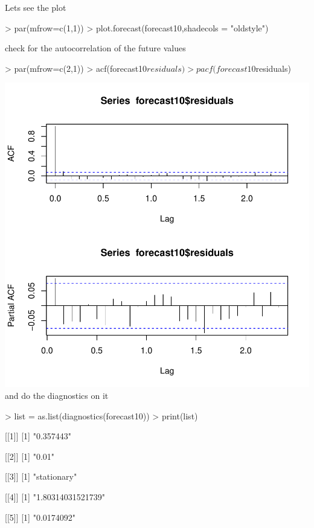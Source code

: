\documentclass[11pt, a4paper]{article} %
\begin{document}
Lets see the plot\\
\begin{Schunk}
\begin{Sinput}
> par(mfrow=c(1,1))
> plot.forecast(forecast10,shadecols = "oldstyle")
\end{Sinput}
\end{Schunk}
check for the autocorrelation of the future values\\
\begin{Schunk}
\begin{Sinput}
> par(mfrow=c(2,1))
> acf(forecast10$residuals)
> pacf(forecast10$residuals)
\end{Sinput}
\end{Schunk}
\includegraphics{alleselena-058}
and do the diagnostics on it\\
\begin{Schunk}
\begin{Sinput}
> list = as.list(diagnostics(forecast10))
> print(list)
\end{Sinput}
[[1]]
[1] "0.357443"

[[2]]
[1] "0.01"

[[3]]
[1] "stationary"

[[4]]
[1] "1.80314031521739"

[[5]]
[1] "0.0174092"\end{Schunk}
\end{document}
